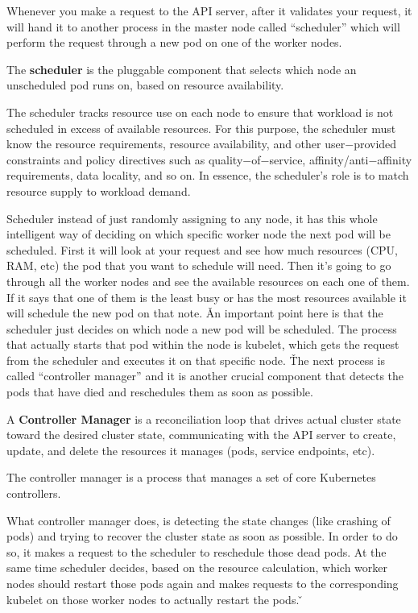 Whenever you make a request to the API server, after it validates your request, it will hand it to another process in
the master node called ``scheduler'' which will perform the request through a new pod on one of the worker nodes.

\bd[Scheduler]
The \textbf{scheduler} is the pluggable component that selects which node an unscheduled pod runs on, based on resource
availability.
\ed

The scheduler tracks resource use on each node to ensure that workload is not scheduled in excess of available
resources. For this purpose, the scheduler must know the resource requirements, resource availability, and other
user$-$provided constraints and policy directives such as quality$-$of$-$service, affinity/anti$-$affinity
requirements, data locality, and so on. In essence, the scheduler's role is to match resource supply to workload demand.


Scheduler instead of just randomly assigning to any node, it has this whole intelligent way of deciding on which
specific worker node the next pod will be scheduled. First it will look at your request and see how much resources
(CPU, RAM, etc) the pod that you want to schedule will need. Then it's going to go through all the worker nodes and
see the available resources on each one of them. If it says that one of them is the least busy or has the most
resources available it will schedule the new pod on that note. \v

An important point here is that the scheduler just decides on which node a new pod will be scheduled. The process
that actually starts that pod within the node is kubelet, which gets the request from the scheduler and executes it
on that specific node. \v

The next process is called ``controller manager'' and it is another crucial component that detects the pods that have
died and reschedules them as soon as possible.

A \textbf{Controller Manager} is a reconciliation loop that drives actual cluster state toward the desired cluster
state, communicating with the API server to create, update, and delete the resources it manages (pods, service
endpoints, etc).
\ed

The controller manager is a process that manages a set of core Kubernetes controllers.


What controller manager does, is detecting the state changes (like crashing of pods) and trying to recover the
cluster state as soon as possible. In order to do so, it makes a request to the scheduler to reschedule those dead
pods. At the same time scheduler decides, based on the resource calculation, which worker nodes should restart those
pods again and makes requests to the corresponding kubelet on those worker nodes to actually restart the pods. \v

